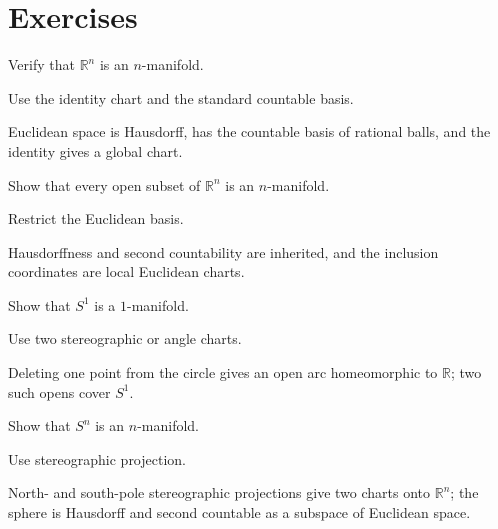 \section{Exercises}
\begin{exercise}\label{exr:vii01-01}
Verify that \(\mathbb R^n\) is an \(n\)-manifold.
\end{exercise}
\begin{hint}
Use the identity chart and the standard countable basis.
\end{hint}
\begin{solution}Euclidean space is Hausdorff, has the countable basis of rational balls, and the identity gives a global chart.\end{solution}

\begin{exercise}\label{exr:vii01-02}
Show that every open subset of \(\mathbb R^n\) is an \(n\)-manifold.
\end{exercise}
\begin{hint}
Restrict the Euclidean basis.
\end{hint}
\begin{solution}Hausdorffness and second countability are inherited, and the inclusion coordinates are local Euclidean charts.\end{solution}

\begin{exercise}\label{exr:vii01-03}
Show that \(S^1\) is a \(1\)-manifold.
\end{exercise}
\begin{hint}
Use two stereographic or angle charts.
\end{hint}
\begin{solution}Deleting one point from the circle gives an open arc homeomorphic to \(\mathbb R\); two such opens cover \(S^1\).\end{solution}

\begin{exercise}\label{exr:vii01-04}
Show that \(S^n\) is an \(n\)-manifold.
\end{exercise}
\begin{hint}
Use stereographic projection.
\end{hint}
\begin{solution}North- and south-pole stereographic projections give two charts onto \(\mathbb R^n\); the sphere is Hausdorff and second countable as a subspace of Euclidean space.\end{solution}

